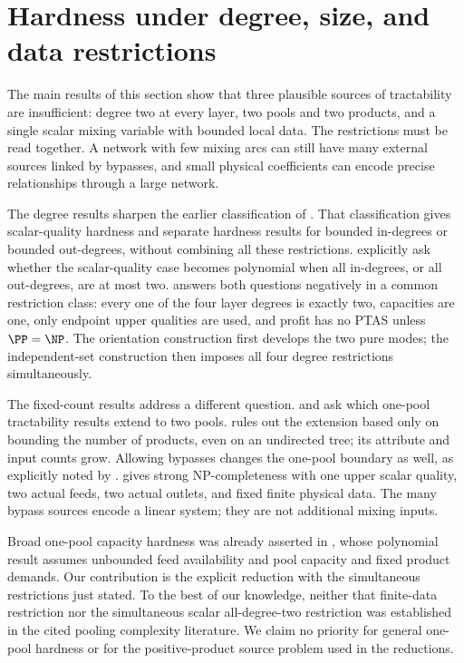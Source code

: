 \section{Hardness under degree, size, and data restrictions}\label{s3:hardness}

The main results of this section show that three plausible sources of
tractability are insufficient: degree two at every layer, two pools and
two products, and a single scalar mixing variable with bounded local data.
The restrictions must be read together. A network with few mixing arcs
can still have many external sources linked by bypasses, and small
physical coefficients can encode precise relationships through a large
network.

The degree results sharpen the earlier classification of
\citet[Sections~4--6]{haugland2016-the-computational-complexity-of-the}.
That classification gives scalar-quality hardness and separate hardness
results for bounded in-degrees or bounded out-degrees, without combining
all these restrictions. \citet[author manuscript, Section~4, p.~8]{s4:boland2017}
explicitly ask whether the scalar-quality case becomes polynomial when
all in-degrees, or all out-degrees, are at most two.
 answers both questions negatively in a common
restriction class: every one of the four layer degrees is exactly two,
capacities are one, only endpoint upper qualities are used, and profit
has no PTAS unless $\PP=\NP$. The orientation construction first develops
the two pure modes; the independent-set construction then imposes all
four degree restrictions simultaneously.

The fixed-count results address a different question.
\citet[Section~6, p.~214]{haugland2016-the-computational-complexity-of-the}
and \citet[author manuscript, Section~4, p.~8]{s4:boland2017} ask which
one-pool tractability results extend to two pools.
 rules out the extension based only on bounding the
number of products, even on an undirected tree; its attribute and input
counts grow. Allowing bypasses changes the one-pool boundary as well,
as explicitly noted by
\citet[Section~4.5, p.~607]{s3:haugland-hendrix2016}.
 gives strong NP-completeness with one upper scalar
quality, two actual feeds, two actual outlets, and fixed finite physical
data. The many bypass sources encode a linear system; they are not
additional mixing inputs.

Broad one-pool capacity hardness was already asserted in
\citet[Remark~4.6]{s3:baltean2018}, whose polynomial result assumes
unbounded feed availability and pool capacity and fixed product demands.
Our contribution is the explicit reduction with the simultaneous
restrictions just stated. To the best of our knowledge, neither that
finite-data restriction nor the simultaneous scalar all-degree-two
restriction was established in the cited pooling complexity literature.
We claim no priority for general one-pool hardness or for the
positive-product source problem used in the reductions.

